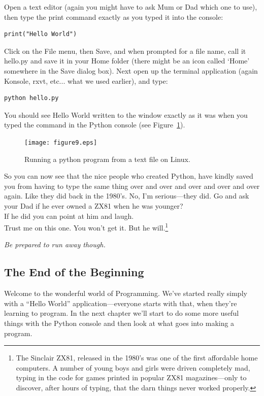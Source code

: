 \begin{LINUX}
Open a text editor (again you might have to ask Mum or Dad which one to use), then type the print command exactly as you typed it into the console:

\begin{listing}
\begin{verbatim}
print("Hello World")
\end{verbatim}
\end{listing}

Click on the File menu, then Save, and when prompted for a file name, call it hello.py and save it in your Home folder (there might be an icon called `Home' somewhere in the Save dialog box).  Next open up the terminal application (again Konsole, rxvt, etc... what we used earlier), and type:

\begin{listing}
\begin{verbatim}
python hello.py
\end{verbatim}
\end{listing}

You should see Hello World written to the window exactly as it was when you typed the command in the Python console (see Figure~\ref{fig9}).

\begin{figure}
\begin{center}
\texttt{[image: figure9.eps]}
\end{center}
\caption{Running a python program from a text file on Linux.}\label{fig9}
\end{figure}
\end{LINUX}

So you can now see that the nice people who created Python, have kindly saved you from having to type the same thing over and over and over and over and over again.  Like they did back in the 1980's.  No, I'm serious---they did.  Go and ask your Dad if he ever owned a ZX81 when he was younger?\\

\noindent
If he did you can point at him and laugh.\\

\noindent
Trust me on this one.  You won't get it.  But he will.\footnote{The Sinclair ZX81, released in the 1980's was one of the first affordable home computers.  A number of young boys and girls were driven completely mad, typing in the code for games printed in popular ZX81 magazines---only to discover, after hours of typing, that the darn things never worked properly.}

\noindent
\emph{Be prepared to run away though.}

\subsection*{\color{BrickRed}The End of the Beginning}

Welcome to the wonderful world of Programming.  We've started really simply with a ``Hello World'' application---everyone starts with that, when they're learning to program.
In the next chapter we'll start to do some more useful things with the Python console and then look at what goes into making a program.

\newpage